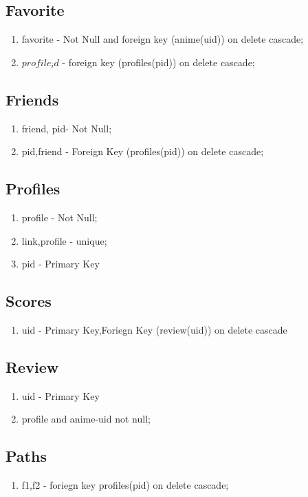 \documentclass[11pt]{article}
\begin{document}
\subsection {Favorite}
\begin{enumerate}
\item favorite - Not Null and foreign key (anime(uid)) on delete cascade;
\item $profile_id$ - foreign key (profiles(pid)) on delete cascade;
\end{enumerate}

\subsection {Friends}
\begin{enumerate}
\item friend, pid- Not Null;
\item pid,friend - Foreign Key (profiles(pid)) on delete cascade;
\end{enumerate}



\subsection {Profiles}
\begin{enumerate}
\item profile - Not Null;
\item link,profile - unique;
\item pid - Primary Key
\end{enumerate}


\subsection {Scores}
\begin{enumerate}
\item uid - Primary Key,Foriegn Key (review(uid)) on delete cascade
\end{enumerate}


\subsection {Review}
\begin{enumerate}
\item uid - Primary Key
\item profile and anime-uid not null;
\end{enumerate}


\subsection {Paths}
\begin{enumerate}
\item f1,f2 - foriegn key profiles(pid) on delete cascade;
\end{enumerate}
\end{document}
